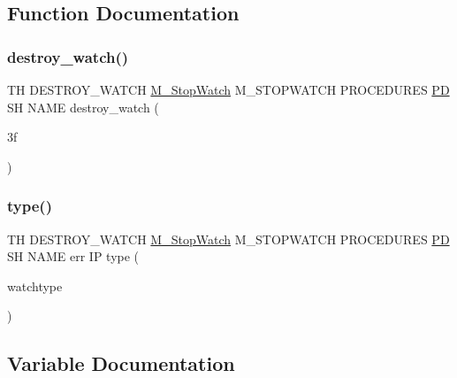 \subsection{Function Documentation}
\mbox{\label{destroy__watch_83_8txt_aeb23b46d3b50996f7af1c0c77c7fe713}} 
\subsubsection{\texorpdfstring{destroy\+\_\+watch()}{destroy\_watch()}}
{\footnotesize\ttfamily TH D\+E\+S\+T\+R\+O\+Y\+\_\+\+W\+A\+T\+CH \hyperlink{option__stopwatch_83_8txt_aa2011fc45a5e502e87ee50996a8a9305}{M\+\_\+\+Stop\+Watch} M\+\_\+\+S\+T\+O\+P\+W\+A\+T\+CH P\+R\+O\+C\+E\+D\+U\+R\+ES \hyperlink{what__overview_81_8txt_a85f26da5a4481fbdb0d9c79f2b94de3e}{PD} SH N\+A\+ME destroy\+\_\+watch (\begin{DoxyParamCaption}\item[{3f}]{ }\end{DoxyParamCaption})}

\mbox{\label{destroy__watch_83_8txt_a7bc32e4b0bf5a4206ac0c208a77e9d4b}} 
\subsubsection{\texorpdfstring{type()}{type()}}
{\footnotesize\ttfamily TH D\+E\+S\+T\+R\+O\+Y\+\_\+\+W\+A\+T\+CH \hyperlink{option__stopwatch_83_8txt_aa2011fc45a5e502e87ee50996a8a9305}{M\+\_\+\+Stop\+Watch} M\+\_\+\+S\+T\+O\+P\+W\+A\+T\+CH P\+R\+O\+C\+E\+D\+U\+R\+ES \hyperlink{what__overview_81_8txt_a85f26da5a4481fbdb0d9c79f2b94de3e}{PD} SH N\+A\+ME err IP type (\begin{DoxyParamCaption}\item[{watchtype}]{ }\end{DoxyParamCaption})}



\subsection{Variable Documentation}
\mbox{\label{destroy__watch_83_8txt_ac1453e74487611128ccb9ee120e5c70d}} 
